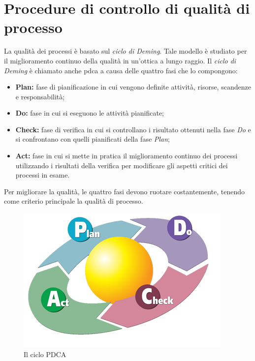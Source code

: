 
\chapter{Procedure di controllo di qualità di processo}
La qualità dei processi è basato sul \textit{ciclo di Deming}. Tale modello è studiato per il miglioramento continuo della qualità in un'ottica a lungo raggio. Il \textit{ciclo di Deming} è chiamato anche \gls{pdca} a causa delle quattro fasi che lo compongono:
\begin{itemize}
	\item \textbf{Plan:} fase di pianificazione in cui vengono definite attività, risorse, scandenze e responsabilità;
	\item \textbf{Do:} fase in cui si eseguono le attività pianificate;
	\item \textbf{Check:} fase di verifica in cui si controllano i risultato ottenuti nella fase \textit{Do} e si confrontano con quelli pianificati della fase \textit{Plan};
	\item \textbf{Act:} fase in cui si mette in pratica il miglioramento continuo dei processi utilizzando i risultati della verifica per modificare gli aspetti critici dei processi in esame.
\end{itemize}

Per migliorare la qualità, le quattro fasi devono ruotare costantemente, tenendo come criterio principale la qualità di processo.

\begin{figure}[h]
\centering
\includegraphics[width=0.6\linewidth]{immagini/pdca}
\caption[Il ciclo PDCA]{Il ciclo PDCA}
\label{fig:pdca}
\end{figure}




